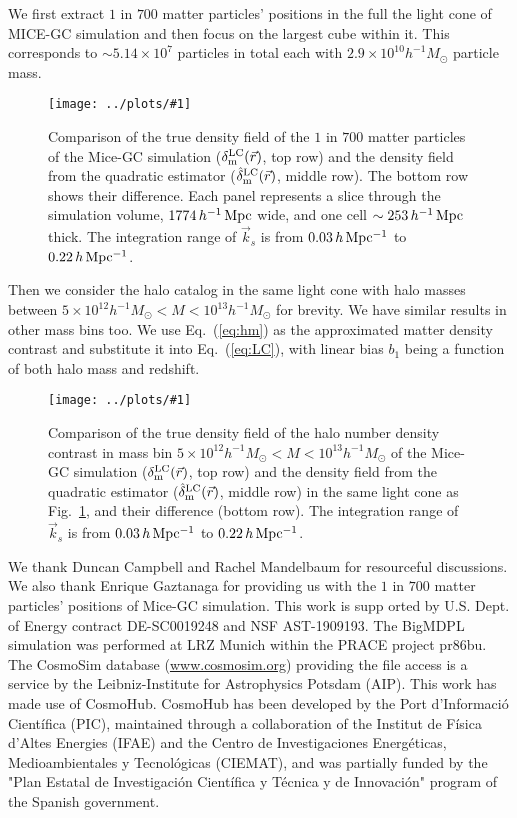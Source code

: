 \documentclass[prd,amsmath,amssymb,floatfix,superscriptaddress,nofootinbib,twocolumn]{revtex4-1}
\newcommand{\vrr}{\vec{r}}
\newcommand{\vk}{\vec{k}}
\newcommand{\ec}[1]{Eq.~(\ref{eq:#1})}
\newcommand{\rf}[1]{\ref{fig:#1}}
\newcommand{\sfig}[2]{
\texttt{[image: ../plots/\#1]}
        }
\newcommand{\Sfig}[2]{
   \begin{figure}[thbp]
   \begin{center}
    \sfig{../plots/#1.pdf}{\columnwidth}
    \caption{{\small #2}}
    \label{fig:#1}
     \end{center}
   \end{figure}
}
\begin{document}
We first extract $1$ in $700$  matter particles' positions in the full the light cone of MICE-GC simulation and then focus on the largest cube within it. This corresponds to $\sim 5.14\times 10^{7}$ particles in total each with $2.9\times 10^{10} h^{-1}M_{\odot}$ particle mass. 

\Sfig{real_dm}{Comparison of the true density field of the $1$ in $700$ matter particles of the Mice-GC simulation ($\delta^{\rm LC}_{\rm m}(\vrr)$, top row) and the density field from the quadratic estimator ($\hat{\delta}_{\rm m}^{\rm LC}(\vrr)$, middle row). The bottom row shows their difference. Each panel represents a slice through the simulation volume, $1774\,h^{-1}\rm \, Mpc$ wide, and one cell $\sim 253\,h^{-1}\rm \, Mpc$ thick. The integration range of $\vk_{s}$ is from $0.03\, h \rm \, Mpc^{-1}$ to $0.22\, h \rm \, Mpc^{-1}$.}

Then we consider the halo catalog in the same light cone with halo masses between $5 \times 10^{12}h^{-1}M_{\odot}<M < 10^{13}h^{-1}M_{\odot}$ for brevity. We have similar results in other mass bins too. We use \ec{hm} as the approximated matter density contrast and substitute it into \ec{LC}, with linear bias $b_{1}$ being a function of both halo mass and redshift. 

\Sfig{real_halo}{Comparison of the true density field of the halo number density contrast in mass bin $5 \times 10^{12}h^{-1}M_{\odot}<M < 10^{13}h^{-1}M_{\odot}$ of the Mice-GC simulation ($\delta^{\rm LC}_{\rm m}(\vrr)$, top row) and the density field from the quadratic estimator ($\hat{\delta}_{\rm m}^{\rm LC}(\vrr)$, middle row) in the same light cone as Fig.~\rf{real_dm}, and their difference (bottom row). The integration range of $\vk_{s}$ is from $0.03\, h \rm \, Mpc^{-1}$ to $0.22\, h \rm \, Mpc^{-1}$.} 


\acknowledgements
We thank Duncan Campbell and Rachel Mandelbaum for resourceful discussions. We also thank Enrique Gaztanaga for providing us with the $1$ in $700$ matter particles' positions of Mice-GC simulation. This work is supp orted by U.S. Dept. of Energy contract DE-SC0019248 and NSF AST-1909193.
The BigMDPL simulation was performed at LRZ Munich within the PRACE project pr86bu. The CosmoSim database (\url{www.cosmosim.org}) providing the file access is a service by the Leibniz-Institute for Astrophysics Potsdam (AIP).
This work has made use of CosmoHub. CosmoHub has been developed by the Port d'Informació Científica (PIC), maintained through a collaboration of the Institut de Física d'Altes Energies (IFAE) and the Centro de Investigaciones Energéticas, Medioambientales y Tecnológicas (CIEMAT), and was partially funded by the "Plan Estatal de Investigación Científica y Técnica y de Innovación" program of the Spanish government.
\end{document}
